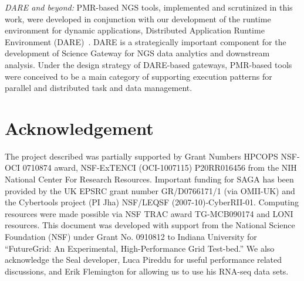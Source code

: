 \documentclass{acm_proc_article-sp}
\begin{document}
\textit{DARE and beyond: }PMR-based NGS tools, implemented and
scrutinized in this work, were developed in conjunction with our
development of the runtime environment for dynamic applications,
Distributed Application Runtime Environment
(DARE)~\cite{dare-tg11,dare-ecmls11}.  DARE is a strategically
important component for the development of Science Gateway for NGS
data analytics and downstream analysis.  Under the design strategy of
DARE-based gateways, PMR-based tools were conceived to be a main
category of supporting execution patterns for parallel and distributed
task and data management.


\section*{Acknowledgement}

The project described was partially supported by Grant Numbers HPCOPS
NSF-OCI 0710874 award, NSF-ExTENCI (OCI-1007115) P20RR016456 from the
NIH National Center For Research Resources.  Important funding for
SAGA has been provided by the UK EPSRC grant number GR/D0766171/1 (via
OMII-UK) and the Cybertools project (PI Jha) NSF/LEQSF
(2007-10)-CyberRII-01.  Computing resources were made possible via NSF
TRAC award TG-MCB090174 and LONI resources.  This document was
developed with support from the National Science Foundation (NSF)
under Grant No.  0910812 to Indiana University for ``FutureGrid: An
Experimental, High-Performance Grid Test-bed.''  We also acknowledge
the Seal developer, Luca Pireddu for useful performance related
discussions, and Erik Flemington for allowing us to use his RNA-seq
data sets.



\end{document}
